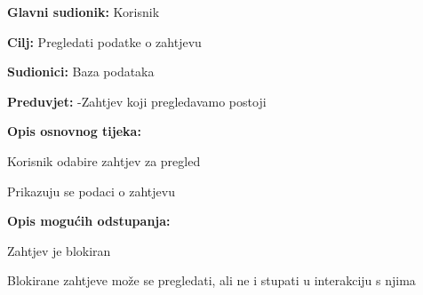			\noindent {}
			\begin{packed_item}
				
				\item \textbf{Glavni sudionik: }Korisnik
				\item  \textbf{Cilj:} Pregledati podatke o zahtjevu
				\item  \textbf{Sudionici:} Baza podataka
				\item  \textbf{Preduvjet:} -Zahtjev koji pregledavamo postoji
				\item  \textbf{Opis osnovnog tijeka:}
				
				\item[] \begin{packed_enum}
					
					\item Korisnik odabire zahtjev za pregled
					\item Prikazuju se podaci o zahtjevu
					
				\end{packed_enum}
				
				\item  \textbf{Opis mogućih odstupanja:}
				
				\item[] \begin{packed_item}
					
					
					\item[2.a] Zahtjev je blokiran
					\item[] \begin{packed_enum}
						
						\item Blokirane zahtjeve može se pregledati, ali ne i stupati u interakciju s njima
						
					\end{packed_enum}
					
				\end{packed_item}
			\end{packed_item}
			
